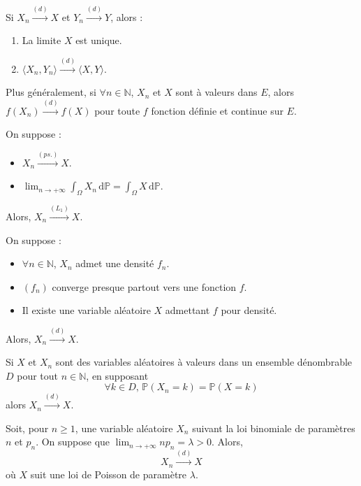 
	\begin{proposition}
		Si $X_n \overset{(d)}{\longrightarrow} X$ et $Y_n \overset{(d)}{\longrightarrow} Y$, alors :
		\begin{enumerate}[label=(\roman*)]
			\item La limite $X$ est unique.
			\item $\langle X_n, Y_n \rangle \overset{(d)}{\longrightarrow} \langle X, Y \rangle$.
		\end{enumerate}
		Plus généralement, si $\forall n \in \mathbb{N}$, $X_n$ et $X$ sont à valeurs dans $E$, alors $f(X_n) \overset{(d)}{\longrightarrow} f(X)$ pour toute $f$ fonction définie et continue sur $E$.
	\end{proposition}

	\begin{theorem}
		On suppose :
		\begin{itemize}
			\item $X_n \overset{(ps.)}{\longrightarrow} X$.
			\item $\lim_{n \rightarrow +\infty} \int_\Omega X_n \, \mathrm{d}\mathbb{P} = \int_\Omega X \, \mathrm{d}\mathbb{P}$.
		\end{itemize}
		Alors, $X_n \overset{(L_1)}{\longrightarrow} X$.
	\end{theorem}

	\begin{corollary}
		On suppose :
		\begin{itemize}
			\item $\forall n \in \mathbb{N}$, $X_n$ admet une densité $f_n$.
			\item $(f_n)$ converge presque partout vers une fonction $f$.
			\item Il existe une variable aléatoire $X$ admettant $f$ pour densité.
		\end{itemize}
		Alors, $X_n \overset{(d)}{\longrightarrow} X$.
	\end{corollary}

	\begin{corollary}
		Si $X$ et $X_n$ sont des variables aléatoires à valeurs dans un ensemble dénombrable $D$ pour tout $n \in \mathbb{N}$, en supposant
		\[ \forall k \in D, \, \mathbb{P}(X_n = k) = \mathbb{P}(X = k) \]
		alors $X_n \overset{(d)}{\longrightarrow} X$.
	\end{corollary}

	\begin{application}
		Soit, pour $n \geq 1$, une variable aléatoire $X_n$ suivant la loi binomiale de paramètres $n$ et $p_n$. On suppose que $\lim_{n \rightarrow +\infty} n p_n = \lambda > 0$.
		Alors,
		\[ X_n \overset{(d)}{\longrightarrow} X \]
		où $X$ suit une loi de Poisson de paramètre $\lambda$.
	\end{application}

